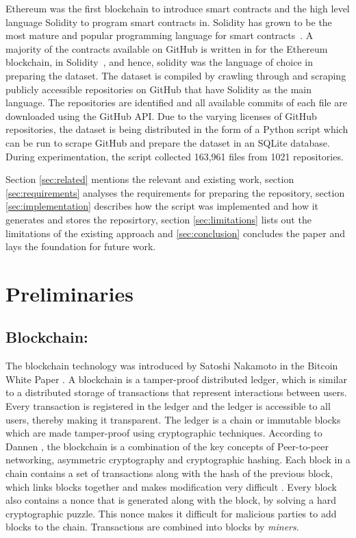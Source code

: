 \documentclass[10pt,conference]{IEEEtran}
\begin{document}
	Ethereum was the first blockchain to introduce smart contracts and the high level language Solidity to program smart contracts in. Solidity has grown to be the most mature and popular programming language for smart contracts~\cite{soliditycheck}. A majority of the contracts available on GitHub is written in for the Ethereum blockchain, in Solidity~\cite{empiricalgithubcontracts}, and hence, solidity was the language of choice in preparing the dataset.  The dataset is compiled by crawling through and scraping publicly accessible repositories on GitHub that have Solidity as the main language. The repositories are identified and all available commits of each file are downloaded using the GitHub API. Due to the varying licenses of GitHub repositories, the dataset is being distributed in the form of a Python script which can be run to scrape GitHub and prepare the dataset in an SQLite database. During experimentation, the script collected 163,961 files from 1021 repositories.
	
	Section \ref{sec:related} mentions the relevant and existing work, section \ref{sec:requirements} analyses the requirements for preparing the repository, section \ref{sec:implementation} describes how the script was implemented and how it generates and stores the reposirtory, section \ref{sec:limitations} lists out the limitations of the existing approach and \ref{sec:conclusion} concludes the paper and lays the foundation for future work.
	
	
	\section{Preliminaries}
	\label{sec:prelims}
	
	\subsection{Blockchain:}
	The blockchain technology was introduced by Satoshi Nakamoto in the Bitcoin White Paper \cite{bitcoinpaper}. A blockchain is a tamper-proof distributed ledger, which is similar to a distributed storage of transactions \cite{bitcoinbook} that represent interactions between users. Every transaction is registered in the ledger and the ledger is accessible to all users, thereby making it transparent. The ledger is a chain or immutable blocks which are made tamper-proof using cryptographic techniques. According to Dannen \cite{bitcoinbook}, the blockchain is a combination of the key concepts of Peer-to-peer networking, asymmetric cryptography and cryptographic hashing. Each block in a chain contains a set of transactions along with the hash of the previous block, which links blocks together and makes modification very difficult \cite{bitcoinpaper}. Every block also contains a nonce that is generated along with the block, by solving a hard cryptographic puzzle. This nonce makes it difficult for malicious parties to add blocks to the chain. Transactions are combined into blocks by \textit{miners}.
	
\end{document}
